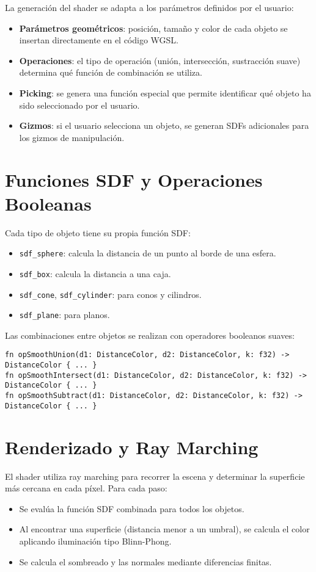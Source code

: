 La generación del shader se adapta a los parámetros definidos por el usuario:

\begin{itemize}
    \item \textbf{Parámetros geométricos}: posición, tamaño y color de cada objeto se insertan directamente en el código WGSL.
    \item \textbf{Operaciones}: el tipo de operación (unión, intersección, sustracción suave) determina qué función de combinación se utiliza.
    \item \textbf{Picking}: se genera una función especial que permite identificar qué objeto ha sido seleccionado por el usuario.
    \item \textbf{Gizmos}: si el usuario selecciona un objeto, se generan SDFs adicionales para los gizmos de manipulación.
\end{itemize}

\section{Funciones SDF y Operaciones Booleanas}

Cada tipo de objeto tiene su propia función SDF:

\begin{itemize}
    \item \texttt{sdf\_sphere}: calcula la distancia de un punto al borde de una esfera.
    \item \texttt{sdf\_box}: calcula la distancia a una caja.
    \item \texttt{sdf\_cone}, \texttt{sdf\_cylinder}: para conos y cilindros.
    \item \texttt{sdf\_plane}: para planos.
\end{itemize}

Las combinaciones entre objetos se realizan con operadores booleanos suaves:

\begin{lstlisting}[language=WGSL]
fn opSmoothUnion(d1: DistanceColor, d2: DistanceColor, k: f32) -> DistanceColor { ... }
fn opSmoothIntersect(d1: DistanceColor, d2: DistanceColor, k: f32) -> DistanceColor { ... }
fn opSmoothSubtract(d1: DistanceColor, d2: DistanceColor, k: f32) -> DistanceColor { ... }
\end{lstlisting}

\section{Renderizado y Ray Marching}

El shader utiliza ray marching para recorrer la escena y determinar la
superficie más cercana en cada píxel. Para cada paso:

\begin{itemize}
    \item Se evalúa la función SDF combinada para todos los objetos.
    \item Al encontrar una superficie (distancia menor a un umbral), se calcula el color
          aplicando iluminación tipo Blinn-Phong.
    \item Se calcula el sombreado y las normales mediante diferencias finitas.
\end{itemize}
